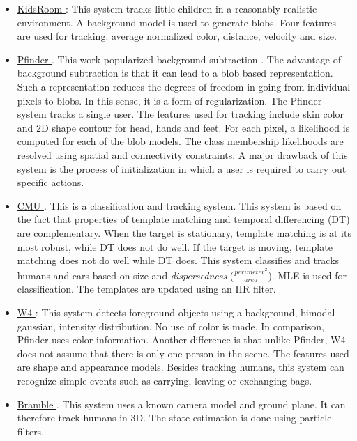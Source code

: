 \begin{itemize}
\item \underline{KidsRoom \cite{1997_CNF_ClosedWorldTracking_Intille}}:  This system tracks little children in a reasonably realistic environment.  A background model is used to generate blobs.  Four features are used for tracking: average normalized color, distance, velocity and size.  

\item \underline{Pfinder \cite{1997_JNL_Pfinder_Wren}}.  This work popularized background subtraction \cite{2006_JNL_SURVEYtrk_Yilmaz}.  The advantage of background subtraction is that it can lead to a blob based representation.  Such a representation reduces the degrees of freedom in going from individual pixels to blobs.  In this sense, it is a form of regularization.  The Pfinder system tracks a single user.  The features used for tracking include skin color and 2D shape contour for head, hands and feet.  For each pixel, a likelihood is computed for each of the blob models.  The class membership likelihoods are resolved using spatial and connectivity constraints.  A major drawback of this system is the process of initialization in which a user is required to carry out specific actions.

\item \underline{CMU \cite{1998_CNF_Tracking_Lipton}}.  This is a classification and tracking system.  This system is based on the fact that properties of template matching and temporal differencing (DT) are complementary.  When the target is stationary, template matching is at its most robust, while DT does not do well.  If the target is moving, template matching does not do well while DT does.  This system classifies and tracks humans and cars based on size and \emph{dispersedness} ($\frac{{perimeter}^2}{area}$).  MLE is used for classification.  The templates are updated using an IIR filter.

\item \underline{W4 \cite{2000_JNL_W4_Haritaoglu}}:  This system detects foreground objects using a background, bimodal-gaussian, intensity distribution.  No use of color is made.  In comparison, Pfinder uses color information.  Another difference is that unlike Pfinder, W4 does not assume that there is only one person in the scene.  The features used are shape and appearance models.  Besides tracking humans, this system can recognize simple events such as carrying, leaving or exchanging bags.

\item \underline{Bramble \cite{2001_CNF_TRKhuman_Isard}}.  This system uses a known camera model and ground plane.  It can therefore track humans in 3D.  The state estimation is done using particle filters.  


\end{itemize}
